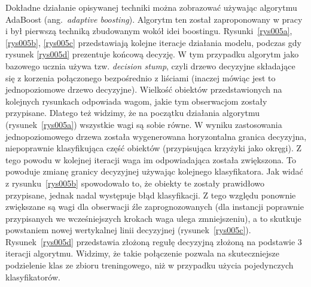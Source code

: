 \documentclass[12pt,a4paper,twoside,openany]{book}
\begin{document}
Dokładne działanie opisywanej techniki można zobrazować używając algorytmu AdaBoost (ang.~\textit{adaptive boosting}). Algorytm ten został zaproponowany w pracy \citep{freund1997} i był pierwszą techniką zbudowanym wokół idei boostingu. Rysunki~\ref{rys005a}, \ref{rys005b}, \ref{rys005c} przedstawiają kolejne iteracje działania modelu, podczas gdy rysunek \ref{rys005d} prezentuje końcową decyzję. W tym przypadku algorytm jako bazowego ucznia używa tzw. \textit{decision stump}, czyli drzewo decyzyjne składające się z korzenia połączonego bezpośrednio z liściami (inaczej mówiąc jest to jednopoziomowe drzewo decyzyjne). Wielkość obiektów przedstawionych na kolejnych rysunkach odpowiada wagom, jakie tym obserwacjom zostały przypisane. Dlatego też widzimy, że na początku działania algorytmu (rysunek~\ref{rys005a}) wszystkie wagi są sobie równe. W wyniku zastosowania jednopoziomowego drzewa została wygenerowana horyzontalna granica decyzyjna, niepoprawnie klasyfikująca część obiektów (przypisująca krzyżyki jako okręgi). Z tego powodu w kolejnej iteracji waga im odpowiadająca została zwiększona. To powoduje zmianę granicy decyzyjnej używając kolejnego klasyfikatora. Jak widać z rysunku~\ref{rys005b} spowodowało to, że obiekty te zostały prawidłowo przypisane, jednak nadal występuje błąd klasyfikacji. Z tego względu ponownie zwiększane są wagi dla obserwacji źle zaprognozowanych (dla instancji poprawnie przypisanych we wcześniejszych krokach waga ulega zmniejszeniu), a to skutkuje powstaniem nowej wertykalnej linii decyzyjnej (rysunek~\ref{rys005c}). Rysunek~\ref{rys005d} przedstawia złożoną regułę decyzyjną złożoną na podstawie 3 iteracji algorytmu. Widzimy, że takie połączenie pozwala na skuteczniejsze podzielenie klas ze zbioru treningowego, niż w przypadku użycia pojedynczych klasyfikatorów.
\end{document}
